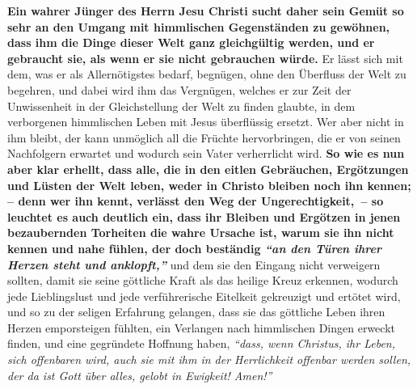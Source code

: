 \label{ref:16_05_weltliches}
\textbf{Ein wahrer Jünger des Herrn Jesu Christi sucht daher sein Gemüt so sehr
an den
Umgang mit himmlischen Gegenständen zu gewöhnen, dass ihm die Dinge dieser Welt
ganz gleichgültig werden, und er gebraucht sie, als wenn er sie nicht
gebrauchen würde.} Er lässt sich mit dem, was er als
Allernötigstes bedarf, begnügen, ohne
den Überfluss der Welt zu begehren,
und dabei wird ihm das
Vergnügen, welches er zur Zeit der Unwissenheit in der Gleichstellung der Welt
zu finden glaubte, in dem verborgenen himmlischen Leben mit Jesus überflüssig
ersetzt. Wer aber nicht in ihm bleibt, der kann unmöglich all die Früchte
hervorbringen, die er von seinen Nachfolgern erwartet und wodurch sein Vater
verherrlicht wird.
\label{ref:16_05_weltliches_2}
\textbf{So wie es nun aber klar erhellt,
dass alle, die in den eitlen Gebräuchen, Ergötzungen und Lüsten der Welt leben,
weder in Christo bleiben noch ihn kennen; -- denn wer ihn kennt, verlässt den
Weg der Ungerechtigkeit,~-- so leuchtet es auch deutlich ein, dass ihr Bleiben und
Ergötzen in jenen bezaubernden Torheiten die wahre Ursache ist, warum sie ihn
nicht kennen und nahe fühlen, der doch beständig
\textit{"`an den Türen ihrer Herzen
steht und anklopft,"'}}
und dem sie den Eingang nicht
verweigern sollten, damit sie seine göttliche Kraft als das heilige Kreuz
erkennen, wodurch jede Lieblingslust und jede verführerische Eitelkeit
gekreuzigt und ertötet wird, und so zu der seligen
Erfahrung gelangen, dass sie
das göttliche Leben ihren Herzen emporsteigen fühlten, ein Verlangen nach
himmlischen Dingen erweckt finden, und eine gegründete Hoffnung haben,
\textit{"`dass,
wenn Christus, ihr Leben, sich offenbaren wird, auch sie mit ihm in der
Herrlichkeit offenbar werden sollen, der da ist Gott über alles, gelobt in
Ewigkeit! Amen!"'}


